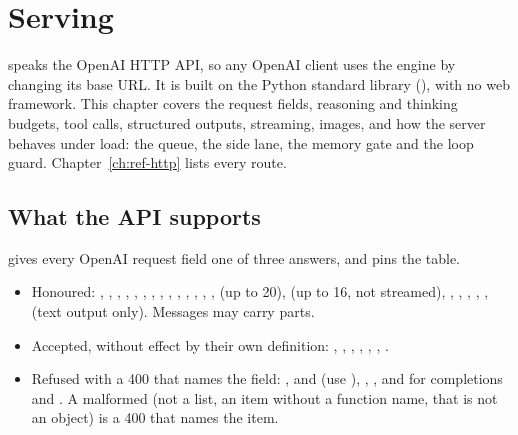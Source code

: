 \chapter{Serving}\label{ch:serving}

 speaks the OpenAI HTTP API, so any OpenAI client uses the engine by changing its base URL. It is built on the Python standard library (), with no web framework. This chapter covers the request fields, reasoning and thinking budgets, tool calls, structured outputs, streaming, images, and how the server behaves under load: the queue, the side lane, the memory gate and the loop guard. Chapter~\ref{ch:ref-http} lists every route.

\section{What the API supports}\label{sec:api-fields}

 gives every OpenAI request field one of three answers, and  pins the table.

\begin{itemize}
\item Honoured: , , , , , , , , , , , , , ,  (up to 20),  (up to 16, not streamed), , , , , ,  (text output only). Messages may carry  parts.
\item Accepted, without effect by their own definition: , , , , , , .
\item Refused with a 400 that names the field: ,  and  (use ), , , and for completions  and . A malformed  (not a list, an item without a function name,  that is not an object) is a 400 that names the item.
\end{itemize}

